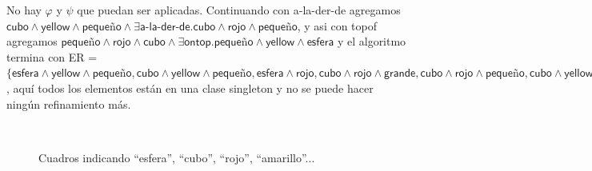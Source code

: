 No hay
$\varphi$ y $\psi$ que puedan ser aplicadas. Continuando con \textsf{a-la-der-de} agregamos $\textsf{cubo} \wedge \textsf{yellow} \wedge \textsf{peque\~no} \wedge \exists \textsf{a-la-der-de}. \textsf{cubo} \wedge \textsf{rojo} \wedge \textsf{peque\~no}$, y asi con \textsf{topof} agregamos $\textsf{peque\~no} \wedge \textsf{rojo} \wedge \textsf{cubo} \wedge \exists \textsf{ontop}. \textsf{peque\~no} \wedge \textsf{yellow} \wedge \textsf{esfera}$ y el algoritmo termina con ER = $\{\textsf{esfera} \wedge \textsf{yellow} \wedge \textsf{peque\~no}, \textsf{cubo} \wedge \textsf{yellow} \wedge \textsf{peque\~no}, \textsf{esfera} \wedge \textsf{rojo}, \textsf{cubo} \wedge \textsf{rojo} \wedge \textsf{grande}, \textsf{cubo} \wedge \textsf{rojo} \wedge \textsf{peque\~no}, \textsf{cubo} \wedge \textsf{yellow} \wedge \textsf{peque\~no} \wedge \exists \textsf{a-la-der-de}. \textsf{cubo} \wedge \textsf{rojo} \wedge \textsf{peque\~no}, \textsf{peque\~no} \wedge \textsf{rojo} \wedge \textsf{cubo} \wedge \exists \textsf{ontop}. \textsf{peque\~no} \wedge \textsf{yellow} \wedge \textsf{esfera}\}$, 
aqu\'i todos los elementos est\'an en una clase singleton y no se puede hacer ning\'un refinamiento m\'as. 





\begin{figure}[ht]
\begin{center}
\\[0pt]
\caption{Cuadros indicando ``esfera'', ``cubo'', ``rojo'', ``amarillo''...}
\label{fig-modelo16}
\end{center}
\end{figure}

